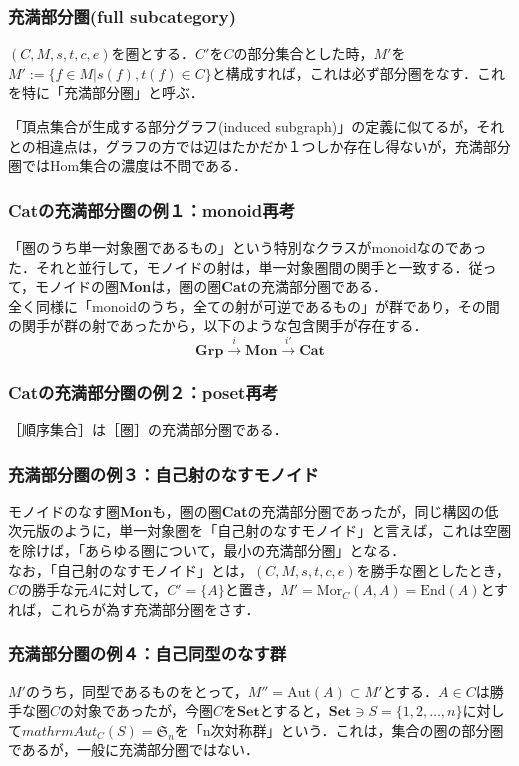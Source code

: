 \documentclass[uplatex, 12pt, a4paper, dvipdfmx]{jsarticle}
\begin{document}
\subsubsection{充満部分圏(full subcategory)}
\begin{shadebox}\begin{definition}[充満部分圏]
    $(C,M,s,t,c,e)$を圏とする．$C'$を$C$の部分集合とした時，$M'$を$M':=\{ f\in M | s(f), t(f)\in C \}$と構成すれば，これは必ず部分圏をなす．これを特に「充満部分圏」と呼ぶ．
\end{definition}\end{shadebox}
「頂点集合が生成する部分グラフ(induced subgraph)」の定義に似てるが，それとの相違点は，グラフの方では辺はたかだか１つしか存在し得ないが，充満部分圏ではHom集合の濃度は不問である．

\subsubsection{\textbf{Cat}の充満部分圏の例１：monoid再考}
「圏のうち単一対象圏であるもの」という特別なクラスがmonoidなのであった．それと並行して，モノイドの射は，単一対象圏間の関手と一致する．従って，モノイドの圏\textbf{Mon}は，圏の圏\textbf{Cat}の充満部分圏である．\\
全く同様に「monoidのうち，全ての射が可逆であるもの」が群であり，その間の関手が群の射であったから，以下のような包含関手が存在する．
$$\mathbf{Grp}\xrightarrow{i}\mathbf{Mon}\xrightarrow{i'}\mathbf{Cat}$$

\subsubsection{\textbf{Cat}の充満部分圏の例２：poset再考}
［順序集合］は［圏］の充満部分圏である．

\subsubsection{充満部分圏の例３：自己射のなすモノイド}
モノイドのなす圏\textbf{Mon}も，圏の圏\textbf{Cat}の充満部分圏であったが，同じ構図の低次元版のように，単一対象圏を「自己射のなすモノイド」と言えば，これは空圏を除けば，「あらゆる圏について，最小の充満部分圏」となる．\\
なお，「自己射のなすモノイド」とは，$(C,M,s,t,c,e)$を勝手な圏としたとき，$C$の勝手な元$A$に対して，$C'=\{ A\}$と置き，$M'=\mathrm{Mor}_C(A,A)=\mathrm{End}(A)$とすれば，これらが為す充満部分圏をさす．

\subsubsection{充満部分圏の例４：自己同型のなす群}
$M'$のうち，同型であるものをとって，$M''=\mathrm{Aut}(A)\subset M'$とする．$A\in C$は勝手な圏$C$の対象であったが，今圏$C$を$\mathbf{Set}$とすると，$\mathbf{Set}\ni S=\{ 1,2,\dots ,n\}$に対して$mathrm{Aut}_C(S)=\mathfrak{S}_n$を「n次対称群」という．これは，集合の圏の部分圏であるが，一般に充満部分圏ではない．
\end{document}
